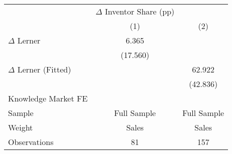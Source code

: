 {
\def\sym#1{\ifmmode^{#1}\else\(^{#1}\)\fi}
\begin{tabular}{l*{2}{c}}
\hline\hline
                    &$\Delta$ Inventor Share (pp)   &               \\
                    &\multicolumn{1}{c}{(1)}   &\multicolumn{1}{c}{(2)}   \\
\hline
$\Delta$ Lerner     &       6.365   &               \\
                    &    (17.560)   &               \\
$\Delta$ Lerner (Fitted)&               &      62.922   \\
                    &               &    (42.836)   \\
\hline
Knowledge Market FE &               &               \\
Sample              & Full Sample   & Full Sample   \\
Weight              &       Sales   &       Sales   \\
Observations        &          81   &         157   \\
\hline\hline
\end{tabular}
}
